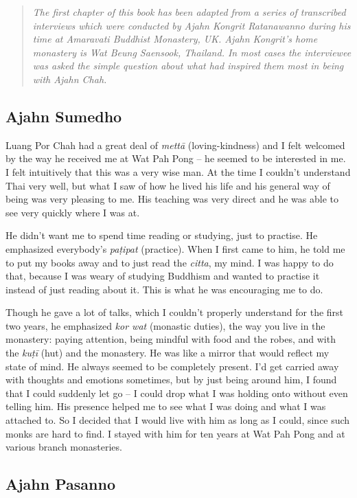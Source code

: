 
\begin{quote}\itshape
The first chapter of this book has been adapted from a series of transcribed interviews which were conducted by Ajahn Kongrit Ratanawanno during his time at Amaravati Buddhist Monastery, UK. Ajahn Kongrit's home monastery is Wat Beung Saensook, Thailand. In most cases the interviewee was asked the simple question about what had inspired them most in being with Ajahn Chah.
\end{quote}

\subsection{Ajahn Sumedho}

Luang Por Chah had a great deal of \emph{mettā} (loving-kindness) and I
felt welcomed by the way he received me at Wat Pah Pong -- he seemed to
be interested in me. I felt intuitively that this was a very wise man. 
At the time I couldn't understand Thai very well, but what I saw of how
he lived his life and his general way of being was very pleasing to me. 
His teaching was very direct and he was able to see very quickly where I
was at. 

He didn't want me to spend time reading or studying, just to practise. 
He emphasized everybody's \emph{paṭipat} (practice). When I first came
to him, he told me to put my books away and to just read the
\emph{citta}, my mind. I was happy to do that, because I was weary of
studying Buddhism and wanted to practise it instead of just reading
about it. This is what he was encouraging me to do. 

Though he gave a lot of talks, which I couldn't properly understand for
the first two years, he emphasized \emph{kor wat} (monastic duties), the
way you live in the monastery: paying attention, being mindful with food
and the robes, and with the \emph{kuṭī} (hut) and the monastery. He was
like a mirror that would reflect my state of mind. He always seemed to
be completely present. I'd get carried away with thoughts and emotions
sometimes, but by just being around him, I found that I could suddenly
let go -- I could drop what I was holding onto without even telling him. 
His presence helped me to see what I was doing and what I was attached
to. So I decided that I would live with him as long as I could, since
such monks are hard to find. I stayed with him for ten years at Wat Pah
Pong and at various branch monasteries. 

\subsection{Ajahn Pasanno}

